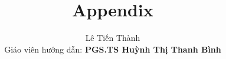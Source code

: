 \title{\textbf{Appendix}}
\author{Lê Tiến Thành\\ Giáo viên hướng dẫn: \textbf{PGS.TS Huỳnh Thị Thanh Bình}}
\date{}